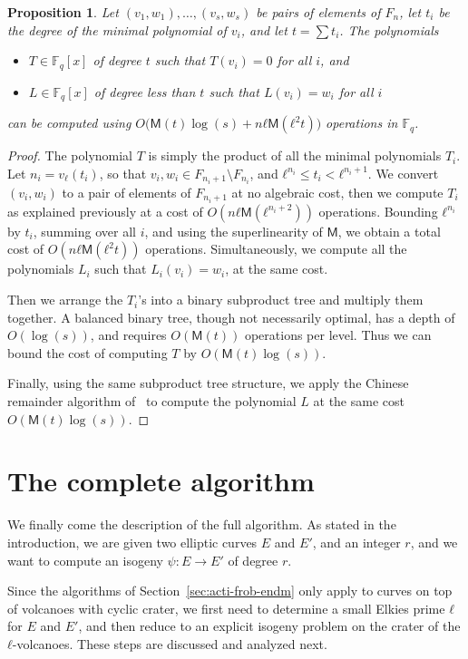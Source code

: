 \documentclass{lms}
\newtheorem{prop}[thm]{Proposition}
\def\cout#1{\mathsf{#1}}
\newcommand{\F}{\mathbb{F}}
\newcommand{\MM}{\cout{M}}
\begin{document}
\begin{prop}\label{prop:interpol}
  Let $(v_1,w_1),\dots,(v_s,w_s)$ be pairs of elements of $F_n$, let
  $t_i$ be the degree of the minimal polynomial of $v_i$, and let
  $t=\sum t_i$. The polynomials
  \begin{itemize}
  \item $T∈\F_q[x]$ of degree $t$ such that $T(v_i)=0$ for all $i$,
    and
  \item $L∈\F_q[x]$ of degree less than $t$ such that $L(v_i)=w_i$ for
    all $i$
  \end{itemize}
  can be computed using
  $O\bigl(\MM(t)\log(s) + nℓ\MM(ℓ^2t)\bigr)$ operations in $\F_q$.
\end{prop}
\begin{proof}
  The polynomial $T$ is simply the product of all the minimal
  polynomials $T_i$. Let $n_i=v_ℓ(t_i)$, so that
  $v_i,w_i∈F_{n_i+1}\setminus F_{n_i}$, and $ℓ^{n_i}≤t_i<ℓ^{n_i+1}$.
  We convert $(v_i,w_i)$ to a pair of elements of $F_{n_i+1}$ at no
  algebraic cost, then we compute $T_i$ as explained previously at a
  cost of $O(nℓ\MM(ℓ^{n_i+2}))$ operations. Bounding $ℓ^{n_i}$ by
  $t_i$, summing over all $i$, and using the superlinearity of $\MM$,
  we obtain a total cost of $O(nℓ\MM(ℓ^2t))$ operations.
  Simultaneously, we compute all the polynomials $L_i$ such that
  $L_i(v_i)=w_i$, at the same cost.

  Then we arrange the $T_i$'s into a binary subproduct tree and
  multiply them together. A balanced binary
  tree, though not necessarily optimal, has a depth of
  $O(\log (s))$, and requires $O(\MM(t))$ operations per level. Thus
  we can bound the cost of computing $T$ by $O(\MM(t)\log(s))$.

  Finally, using the same subproduct tree structure, we apply the
  Chinese remainder algorithm of~\cite[Chapter~10]{vzGG} to compute
  the polynomial $L$ at the same cost $O(\MM(t)\log(s))$.
\end{proof}


\section{The complete algorithm}
\label{sec:complete-algorithm}

We finally come the description of the full algorithm. As stated in
the introduction, we are given two elliptic curves $E$ and $E'$, and
an integer $r$, and we want to compute an isogeny $ψ:E→E'$ of degree
$r$.

Since the algorithms of Section~\ref{sec:acti-frob-endm} only apply to
curves on top of volcanoes with cyclic crater, we first need to
determine a small Elkies prime $ℓ$ for $E$ and $E'$, and then reduce
to an explicit isogeny problem on the crater of the
$ℓ$-volcanoes. These steps are discussed and analyzed next.
\end{document}
